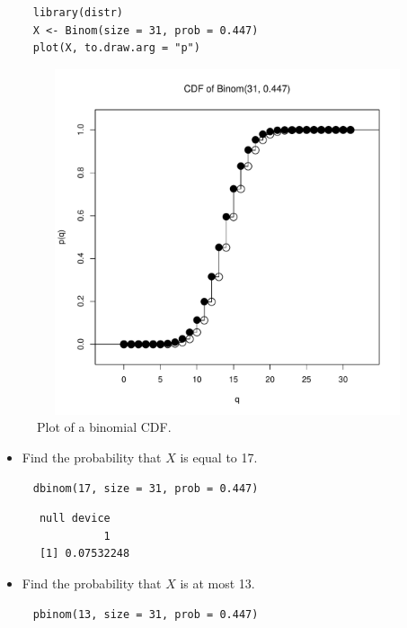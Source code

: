 \documentclass[captions=tableheading]{scrbook}
\begin{document}
\begin{xca}
\begin{verbatim}
     library(distr)
     X <- Binom(size = 31, prob = 0.447)
     plot(X, to.draw.arg = "p")
\end{verbatim}


     \begin{figure}[th]
	      \includegraphics[width=5in, height=4in]{img/binompxca.pdf}
	      \caption[Plot of a binomial CDF]{\small Plot of a binomial CDF.}
	      \label{fig:binompxca}
	    \end{figure}

\begin{itemize}
\item Find the probability that \(X\) is equal to 17.
\end{itemize}

\begin{verbatim}
     dbinom(17, size = 31, prob = 0.447)
\end{verbatim}

\begin{verbatim}
      null device 
                1
      [1] 0.07532248
\end{verbatim}

\begin{itemize}
\item Find the probability that \(X\) is at most 13.
\end{itemize}

\begin{verbatim}
     pbinom(13, size = 31, prob = 0.447)
\end{verbatim}


\end{xca}
\end{document}
